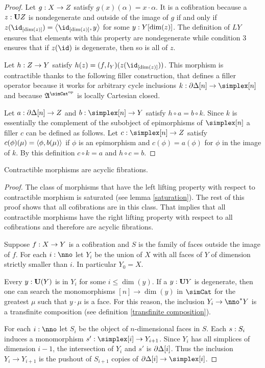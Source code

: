 \documentclass[csh.tex]{subfiles}
\begin{document}
\begin{proof}
Let $g: X\to Z$ satisfy $g(x)(\alpha) = x\cdot\alpha$. It is a cofibration because a $z:\mathbf{U} Z$ is nondegenerate and outside of the image of $g$ if and only if $z(\id_{[\dim(z)]}) = \tuplet{\id_{[\dim(z)]},y}$ for some $y: Y[\dim(z)]$. The definition of $LY$ ensures that elements with this property are nondegenerate while condition 3 ensures that if $z(\id)$ is degenerate, then so is all of $z$.

Let $h: Z\to Y$ satisfy $h(z) = (f,l_Y)(z(\id_{[\dim(z)]}))$. This morphism is contractible thanks to the following filler construction, that defines a filler operator because it works for arbitrary cycle inclusions $k\of\cycle[n]\to\simplex[n]$ and because $\ambient \s$ is locally Cartesian closed.

Let $a: \partial\Delta[n]\to Z$ and $b\of \simplex[n]\to Y$ satisfy $h\circ a = b\circ k$.
Since $k$ is essentially the complement of the subobject of epimorphisms of $\simplex[n]$ a filler $c$ can be defined as follows.
Let $c\of \simplex[n]\to Z$ satisfy $c(\phi)(\mu) = \left\langle \phi,b(\mu) \right\rangle$ if $\phi$ is an epimorphism and $c(\phi) = a(\phi)$ for $\phi$ in the image of $k$. By this definition $c\circ k = a$ and $h\circ c = b$.

\end{proof}

\begin{lemma} Contractible morphisms are acyclic fibrations.\label{Reedy}\end{lemma}

\begin{proof} The class of morphisms that have the left lifting property with respect to contractible morphism is saturated (see lemma \ref{saturation}). The rest of this proof shows that all cofibrations are in this class. That implies that all contractible morphisms have the right lifting property with respect to all cofibrations and therefore are acyclic fibrations.

Suppose $f: X\to Y$ is a cofibration and $S$ is the family of faces outside the image of $f$. For each $i\of\nno$ let $Y_i$ be the union of $X$ with all faces of $Y$ of dimension strictly smaller than $i$. In particular $Y_0=X$.

Every $y:\mathbf{U}(Y)$ is in $Y_i$ for some $i\leq \dim(y)$. If a $y:\mathbf{U} Y$ is degenerate, then one can search the monomorphisms $[n]\to\dim(y)$ in $\simCat$ for the greatest $\mu$ such that $y\cdot\mu$ is a face. For this reason, the inclusion $Y_i\to\nno\ri Y$ is a transfinite composition (see definition \ref{transfinite composition}).

For each $i\of\nno$ let $S_i$ be the object of $n$-dimensional faces in $S$. Each $s: S_i$ induces a monomorphism $s'\of\simplex[i]\to Y_{i+1}$. Since $Y_{i}$ has all simplices of dimension $i-1$, the intersection of $Y_i$ and $s'$ is $\partial\Delta[i]$. Thus the inclusion $Y_i\to Y_{i+1}$ is the pushout of $S_{i+1}$ copies of $\cycle[i]\to\simplex[i]$.
\end{proof}
\end{document}
